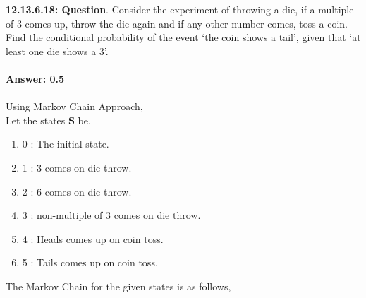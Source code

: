 \documentclass[journal,12pt,onecolumn]{IEEEtran}
\begin{document}
%
\textbf{12.13.6.18: Question}. Consider the experiment of throwing a die, if a multiple of 3 comes up, throw the die again and if any other number comes, toss a coin. Find the conditional probability
of the event ‘the coin shows a tail’, given that ‘at least one die shows a 3’.\\\\
\textbf{Answer: 0.5}\\\\
\solution
Using Markov Chain Approach,\\
Let the states \textbf{S} be,
\begin{enumerate}
\item 0 : The initial state.\\
\item 1 : 3 comes on die throw.\\
\item 2 : 6 comes on die throw.\\
\item 3 : non-multiple of 3 comes on die throw.\\
\item 4 : Heads comes up on coin toss.\\
\item 5 : Tails comes up on coin toss.\\
\end{enumerate}
The Markov Chain for the given states is as follows,
\end{document}
